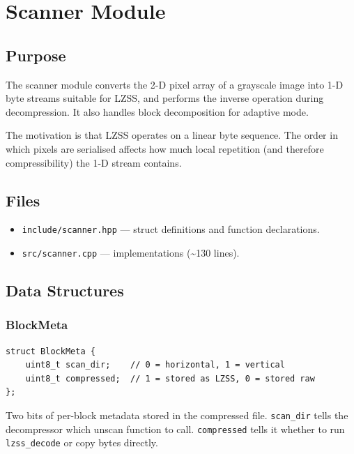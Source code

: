 \section{Scanner Module}

\subsection{Purpose}

The scanner module converts the 2-D pixel array of a grayscale image into 1-D byte
streams suitable for LZSS, and performs the inverse operation during decompression.
It also handles block decomposition for adaptive mode.

The motivation is that LZSS operates on a linear byte sequence.
The order in which pixels are serialised affects how much local repetition
(and therefore compressibility) the 1-D stream contains.

\subsection{Files}

\begin{itemize}
  \item \texttt{include/scanner.hpp} --- struct definitions and function declarations.
  \item \texttt{src/scanner.cpp} --- implementations (\textasciitilde{}130 lines).
\end{itemize}

\subsection{Data Structures}

\subsubsection{BlockMeta}

\begin{lstlisting}[style=cpp]
struct BlockMeta {
    uint8_t scan_dir;    // 0 = horizontal, 1 = vertical
    uint8_t compressed;  // 1 = stored as LZSS, 0 = stored raw
};
\end{lstlisting}

Two bits of per-block metadata stored in the compressed file.
\texttt{scan\_dir} tells the decompressor which unscan function to call.
\texttt{compressed} tells it whether to run \texttt{lzss\_decode} or copy bytes directly.

